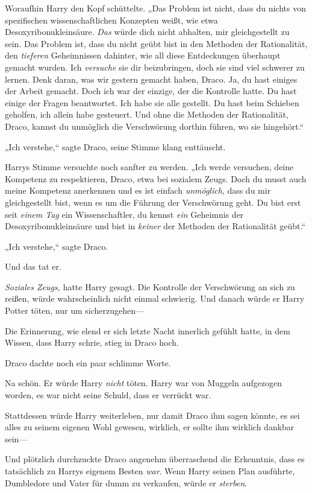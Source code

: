 {Woraufhin Harry den Kopf schüttelte. „Das Problem ist nicht, dass du nichts von spezifischen wissenschaftlichen Konzepten weißt, wie etwa Desoxyribonukleinsäure. \emph{Das} würde dich nicht abhalten, mir gleichgestellt zu sein. Das Problem ist, dass du nicht geübt bist in den Methoden der Rationalität, den \emph{tieferen} Geheimnissen dahinter, wie all diese Entdeckungen überhaupt gemacht wurden. Ich \emph{versuche} sie dir beizubringen, doch sie sind viel schwerer zu lernen. Denk daran, was wir gestern gemacht haben, Draco. Ja, du hast einiges der Arbeit gemacht. Doch ich war der einzige, der die Kontrolle hatte. Du hast einige der Fragen beantwortet. Ich habe sie alle gestellt. Du hast beim Schieben geholfen, ich allein habe gesteuert. Und ohne die Methoden der Rationalität, Draco, kannst du unmöglich die Verschwörung dorthin führen, wo sie hingehört.“

„Ich verstehe,“ sagte Draco, seine Stimme klang enttäuscht.

Harrys Stimme versuchte noch sanfter zu werden. „Ich werde versuchen, deine Kompetenz zu respektieren, Draco, etwa bei sozialem Zeugs. Doch du musst auch meine Kompetenz anerkennen und es ist einfach \emph{unmöglich}, dass du mir gleichgestellt bist, wenn es um die Führung der Verschwörung geht. Du bist erst seit \emph{einem Tag} ein Wissenschaftler, du kennst \emph{ein} Geheimnis der Desoxyribonukleinsäure und bist in \emph{keiner} der Methoden der Rationalität geübt.“

„Ich verstehe,“ sagte Draco.

Und das tat er.

\emph{Soziales Zeugs,} hatte Harry gesagt. Die Kontrolle der Verschwörung an sich zu reißen, würde wahrscheinlich nicht einmal schwierig. Und danach würde er Harry Potter töten, nur um sicherzugehen—

Die Erinnerung, wie elend er sich letzte Nacht innerlich gefühlt hatte, in dem Wissen, dass Harry schrie, stieg in Draco hoch.

Draco dachte noch ein paar schlimme Worte.

Na schön. Er würde Harry \emph{nicht} töten. Harry war von Muggeln aufgezogen worden, es war nicht seine Schuld, dass er verrückt war.

Stattdessen würde Harry weiterleben, nur damit Draco ihm sagen könnte, es sei alles zu seinem eigenen Wohl gewesen, wirklich, er sollte ihm wirklich dankbar sein—

Und plötzlich durchzuckte Draco angenehm überraschend die Erkenntnis, dass es tatsächlich zu Harrys eigenem Besten \emph{war}. Wenn Harry seinen Plan ausführte, Dumbledore und Vater für dumm zu verkaufen, würde er \emph{sterben}.

}
